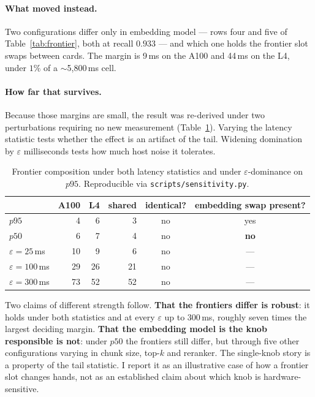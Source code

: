\paragraph{What moved instead.} Two configurations differ only in embedding
model --- rows four and five of Table~\ref{tab:frontier}, both at recall $0.933$
--- and which one holds the frontier slot swaps between cards. The margin is
9\,ms on the A100 and 44\,ms on the L4, under $1\%$ of a $\sim$5{,}800\,ms cell.

\paragraph{How far that survives.} Because those margins are small, the result
was re-derived under two perturbations requiring no new measurement
(Table~\ref{tab:sens}). Varying the latency statistic tests whether the effect is
an artifact of the tail. Widening domination by $\varepsilon$ milliseconds tests
how much host noise it tolerates.

\begin{table}[htbp]
\centering\small
\caption{Frontier composition under both latency statistics and under
$\varepsilon$-dominance on $p95$. Reproducible via
\texttt{scripts/sensitivity.py}.}
\label{tab:sens}
\begin{tabular}{@{}lrrrcc@{}}
\toprule
& A100 & L4 & shared & identical? & embedding swap present? \\
\midrule
$p95$              &  4 &  6 &  3 & no & yes \\
$p50$              &  6 &  7 &  4 & no & \textbf{no} \\
\midrule
$\varepsilon=25$\,ms  & 10 &  9 &  6 & no & --- \\
$\varepsilon=100$\,ms & 29 & 26 & 21 & no & --- \\
$\varepsilon=300$\,ms & 73 & 52 & 52 & no & --- \\
\bottomrule
\end{tabular}
\end{table}

Two claims of different strength follow. \textbf{That the frontiers differ is
robust}: it holds under both statistics and at every $\varepsilon$ up to
300\,ms, roughly seven times the largest deciding margin. \textbf{That the
embedding model is the knob responsible is not}: under $p50$ the frontiers still
differ, but through five other configurations varying in chunk size, top-$k$ and
reranker. The single-knob story is a property of the tail statistic. I report it
as an illustrative case of how a frontier slot changes hands, not as an
established claim about which knob is hardware-sensitive.

